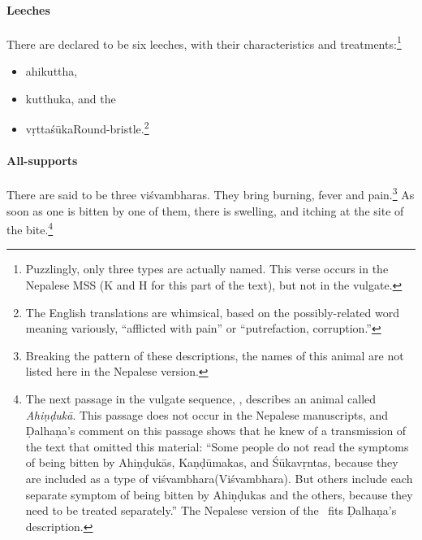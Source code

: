 \begin{translation}
\paragraph{Leeches}

\item[31 add]

There are declared to be six leeches, with their characteristics and 
treatments:\footnote{Puzzlingly, only three types are actually named.  This verse 
occurs in the Nepalese MSS (K and H for this part of the text), but not in the 
vulgate.}
\begin{itemize}
    \item \Gls{ahikuttha},
    \item \Gls{kutthuka}, and the
    \item \Gls{vṛttaśūka}{Round-bristle}.\footnote{The English translations are 
    whimsical, based on the possibly-related word  meaning variously, 
    “afflicted with pain” or “putrefaction, corruption.”}
\end{itemize}

\paragraph{All-supports}
\item[32 verse]

There are said to be three \Glspl{viśvambhara}.  They bring burning,
fever and pain.\footnote{Breaking the pattern of these descriptions,
    the names of this animal are not listed here in the Nepalese version.}
    As soon as one is bitten by one of them, there is swelling, and
    itching at the site of the bite.\footnote{The next passage in the
        vulgate sequence, , describes an animal called
        \emph{Ahiṇḍukā}.  This passage does not occur in the Nepalese
        manuscripts, and Ḍalhaṇa's comment on this passage shows that he knew
        of a transmission of the text that omitted this material:  “Some
        people do not read the symptoms of being bitten by Ahiṇḍukās,
        Kaṇḍūmakas, and Śūkavṛntas, because they are included as a type of
        \Gls{viśvambhara}(Viśvambhara). But others include each separate
        symptom of being bitten by Ahiṇḍukas and the others, because they need
        to be treated separately.”    The Nepalese version of the \SS\ fits
        Ḍalhaṇa's description.}
   
\item[34 verses 1, 2]   


\end{translation}
